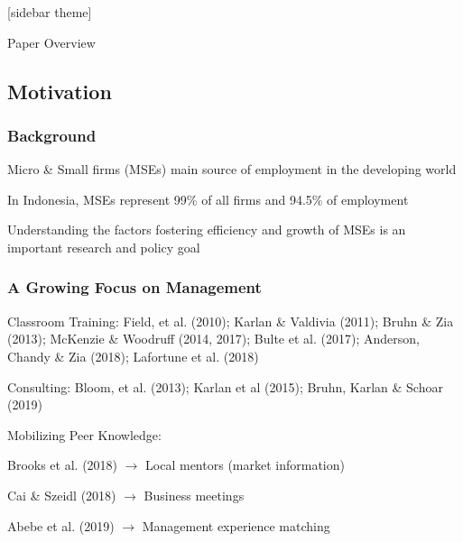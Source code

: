 \documentclass[hideothersubsections, usenames,dvipsnames,10pt]{beamer}
\newenvironment{itemize_3pt}{\itemize\addtolength{\itemsep}{3pt}}{\enditemize}
\begin{document}
[sidebar theme]

\begin{frame}{Paper Overview}
\end{frame}


\subsection{Motivation}

\begin{frame}
\frametitle{Background}
	\begin{itemize_3pt}
	\item Micro \& Small firms (MSEs) main \textcolor{bdf}{source of employment} in the developing world
	\vspace{0.1in}
	\item In \textcolor{bdf}{Indonesia}, MSEs represent 99\% of all firms and 94.5\% of employment 
	\vspace{0.1in}
	\item Understanding the factors fostering efficiency and growth of MSEs is an important research and policy goal
	\end{itemize_3pt}
\end{frame}

\begin{frame}
\frametitle{A Growing Focus on Management}
\begin{itemize_3pt}
\item \textcolor{bdf}{Classroom Training}: Field, et al. (2010); Karlan \& Valdivia (2011); Bruhn \& Zia (2013); McKenzie \& Woodruff (2014, 2017); Bulte et al. (2017); Anderson, Chandy \& Zia (2018); Lafortune et al. (2018)
\vspace{0.1in}
\item \textcolor{bdf}{Consulting}: Bloom, et al. (2013); Karlan et al (2015); Bruhn, Karlan \& Schoar (2019)
\vspace{0.1in}

\item \textcolor{bdf}{Mobilizing Peer Knowledge}:
    \begin{itemize_3pt}
    \item Brooks et al. (2018) $\rightarrow$ Local mentors (market information)
    \item Cai \& Szeidl (2018) $\rightarrow$ Business meetings
    \item Abebe et al. (2019) $\rightarrow$ Management experience matching
    \end{itemize_3pt}
    \vspace{0.1in}
\end{itemize_3pt}
\end{frame}
\end{document}
